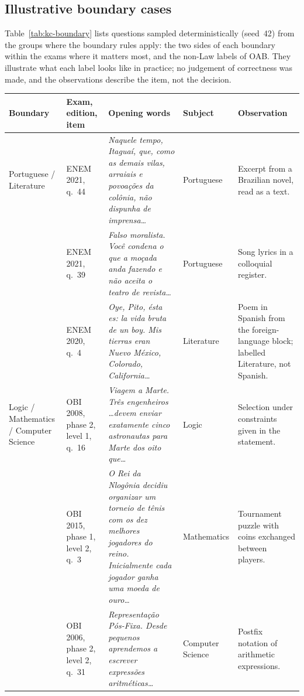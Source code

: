 \subsection{Illustrative boundary cases}
\label{app:kc-boundary}

Table~\ref{tab:kc-boundary} lists questions sampled deterministically
(seed~42) from the groups where the boundary rules apply: the two sides of
each boundary within the exams where it matters most, and the non-Law labels
of OAB. They illustrate what each label looks like in practice; no judgement
of correctness was made, and the observations describe the item, not the
decision.

\begin{table}[t]
\centering
\footnotesize
\setlength{\tabcolsep}{3pt}
\begin{tabular}{@{}llp{}lp{}@{}}
\toprule
Boundary & Exam, edition, item & Opening words & Subject & Observation \\
\midrule
Portuguese / Literature & ENEM 2021, q.~44 & \emph{Naquele tempo, Itaguaí, que, como as demais vilas, arraiais e povoações da colônia, não dispunha de imprensa\ldots} & Portuguese & Excerpt from a Brazilian novel, read as a text. \\
 & ENEM 2021, q.~39 & \emph{Falso moralista. Você condena o que a moçada anda fazendo e não aceita o teatro de revista\ldots} & Portuguese & Song lyrics in a colloquial register. \\
 & ENEM 2020, q.~4 & \emph{Oye, Pito, ésta es: la vida bruta de un boy. Mis tierras eran Nuevo México, Colorado, California\ldots} & Literature & Poem in Spanish from the foreign-language block; labelled Literature, not Spanish. \\
\midrule
Logic / Mathematics / Computer Science & OBI 2008, phase 2, level 1, q.~16 & \emph{Viagem a Marte. Três engenheiros \ldots devem enviar exatamente cinco astronautas para Marte dos oito que\ldots} & Logic & Selection under constraints given in the statement. \\
 & OBI 2015, phase 1, level 2, q.~3 & \emph{O Rei da Nlogônia decidiu organizar um torneio de tênis com os dez melhores jogadores do reino. Inicialmente cada jogador ganha uma moeda de ouro\ldots} & Mathematics & Tournament puzzle with coins exchanged between players. \\
 & OBI 2006, phase 2, level 2, q.~31 & \emph{Representação Pós-Fixa. Desde pequenos aprendemos a escrever expressões aritméticas\ldots} & Computer Science & Postfix notation of arithmetic expressions. \\

\end{tabular}
\end{table}
